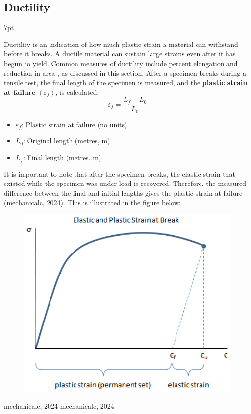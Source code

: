 \documentclass{article}
\newcommand{\formalsource}{} %
\newenvironment{formal}[1][]{%
    \renewcommand{\formalsource}{#1}%
    \def\FrameCommand{%
        \hspace{1pt}%
        {\color{gray}\vrule width 2pt}%
        {\color{white}\vrule width 4pt}%
        \colorbox{white}%
    }%
    \MakeFramed{\advance\hsize-\width\FrameRestore}%
    \noindent\hspace{-4.55pt}%
    \begin{adjustwidth}{}{7pt}%
        \vspace{2pt}%
    }%
    {%
        \vspace{4pt}%
        \ifx\formalsource\empty %
        \else
        \hfill{\footnotesize{\formalsource}}%
        \fi
    \end{adjustwidth}\endMakeFramed%
}
\begin{document}
{\subsection{Ductility}\label{Ductility}
\begin{formal}[mechanicalc, 2024]
Ductility is an indication of how much plastic strain a material can withstand before it breaks. A ductile material can sustain large strains even after it has begun to yield. Common measures of ductility include percent elongation and reduction in area , as discussed in this section.
After a specimen breaks during a tensile test, the final length of the specimen is measured, and the \textbf{plastic strain at failure} $(\varepsilon_f)$, is calculated:
\begin{equation}
    \varepsilon_f = \frac{L_f - L_0}{L_0}
    \label{duc}
\end{equation}
\begin{itemize}[itemsep=-1mm]
    \item $\varepsilon_f$: Plastic strain at failure (no units)
    \item $L_0$: Original length (metres, m)
    \item $L_f$: Final length (metres, m)
\end{itemize}
It is important to note that after the specimen breaks, the elastic strain that existed while the specimen was under load is recovered. Therefore, the measured difference between the final and initial lengths gives the plastic strain at failure (mechanicalc, 2024). This is illustrated in the figure below:\\[8pt]
\begin{minipage}{0.45\textwidth}\centering
    \begin{figure}[H]
    \centering
    \includegraphics[width=1.1\textwidth]{images/elastic-plastic-strain-at-break-01.png}

\end{figure}
\end{minipage}
\end{formal}}
\end{document}
